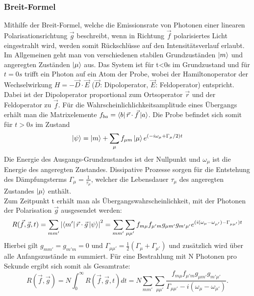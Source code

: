 \subsubsection{Breit-Formel}
Mithilfe der Breit-Formel, welche die Emissionsrate von Photonen einer linearen Polarisationsrichtung $\vec{g}$ beschreibt, wenn in Richtung $\vec{f}$ polarisiertes Licht eingestrahlt wird, werden somit Rückschlüsse auf den Intensitätsverlauf erlaubt. \\
Im Allgemeinen geht man von verschiedenen stabilen Grundzuständen $\ket{m}$ und angeregten Zuständen $\ket{\mu}$ aus. Das System ist für t<0s im Grundzustand und für $t=0s$ trifft ein Photon auf ein Atom der Probe, wobei der Hamiltonoperator der Wechselwirkung $H=-\vec{D}\cdot\vec{E}$ ($\vec{D}$: Dipoloperator, $\vec{E}$: Feldoperator) entspricht. Dabei ist der Dipoloperator proportional zum Ortsoperator $\vec{r}$ und der Feldoperator zu $\vec{f}$. Für die Wahrscheinlichlichkeitsamplitude eines Übergangs erhält man die Matrixelemente $f_{ba}=\bra{b}\vec{r}\cdot\vec{f}\ket{a}$. Die Probe befindet sich somit für $t>0s$ im Zustand \[\ket{\psi}=\ket{m}+\sum_{\mu}f_{\mu m}\ket{\mu}e^{(-i\omega_{\mu}+\Gamma_{\mu}/2)t}\]
Die Energie des Ausgangs-Grundzustandes ist der Nullpunkt und $\omega_{\mu}$ ist die Energie des angeregten Zustandes. Dissipative Prozesse sorgen für die Entstehung des Dämpfungsterms $\Gamma_{\mu}=\frac{1}{\tau_{\mu}}$, welcher die Lebensdauer $\tau_{\mu}$ des angeregten Zustandes $\ket{\mu}$ enthält.\\
Zum Zeitpunkt t erhält man als Übergangswahrscheinlichkeit, mit der Photonen der Polarisation $\vec{g}$ ausgesendet werden: \[R(\vec{f},\vec{g},t)=\sum_{mm'}\left|\bra{m'}\vec{r}\cdot\vec{g}\ket{\psi}\right|^{2}=\sum_{mm'}\sum_{\mu\mu'}f_{m\mu}f_{\mu'm}g_{\mu m'}g_{m'\mu'}e^{(i(\omega_{\mu}-\omega_{\mu'})-\Gamma_{\mu\mu'})t}\]
Hierbei gilt $g_{mm'}=g_{m'm}=0$ und $\Gamma_{\mu\mu'}=\frac{1}{2}(\Gamma_{\mu}+\Gamma_{\mu'})$ und zusätzlich wird über alle Anfangszustände m summiert. Für eine Bestrahlung mit N Photonen pro Sekunde ergibt sich somit als Gesamtrate: \[R(\vec{f},\vec{g})=N\int_{0}^{\infty}R(\vec{f},\vec{g},t)dt=N\sum_{mm'}\sum_{\mu\mu'}\frac{f_{m\mu}f_{\mu'm}g_{\mu m'}g_{m'\mu'}}{\Gamma_{\mu\mu'}-i(\omega_{\mu}-\omega_{\mu'})}.\]
